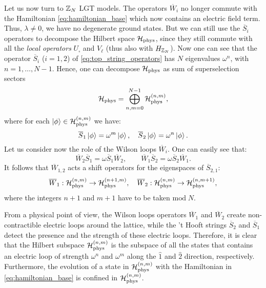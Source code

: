 Let us now turn to $\mathbb{Z}_N$ LGT models.
The operators $\overline{W}_i$ no longer commute with the Hamiltonian \eqref{eq:hamiltonian_base} which now contains an electric field term.
Thus, $\lambda \neq 0$, we have no degenerate ground states.
But we can still use the $\overline{S}_i$ operators to decompose the Hilbert space $\mathcal{H}_{\text{phys}}$, since they still commute with all the \emph{local operators} $U_{\square}$ and $V_{\ell}$ (thus also with $H_{\mathbb{Z}_N}$).
Now one can see that the operator $\overline{S}_i$ ($i=1,2$) of \eqref{eq:top_string_operators} has $N$ eigenvalues $\omega^n$, with $n=1, \dots, N-1$.
Hence, one can decompose $\mathcal{H}_{\text{phys}}$ as sum of superselection sectors
\begin{equation}
    \mathcal{H}_{\text{phys}} = \bigoplus_{n, m=0}^{N-1} \mathcal{H}_{\text{phys}}^{(n, m)},
    \label{eq:decomposizione_Hphys}
\end{equation}
where for each $\ket{\phi} \in \mathcal{H}_{\text{phys}}^{(n, m)}$ we have:
\begin{equation}
    \overline{S}_1 \ket{\phi} = \omega^{m}\ket{\phi}, \quad
    \overline{S}_2 \ket{\phi} = \omega^{n}\ket{\phi}.
\end{equation}
Let us consider now the role of the Wilson loops $\overline{W}_i$.
One can easily see that:
\begin{equation}
    \overline{W}_2 \overline{S}_1 = \omega \overline{S}_1 \overline{W}_2, \qquad
    \overline{W}_1 \overline{S}_2 = \omega \overline{S}_2 \overline{W}_1.
    \label{eq:algebra_op_nonlocali}
\end{equation}
It follows that $\overline{W}_{1,2}$ acts a shift operators for the eigenspaces of $\overline{S}_{2,1}$:
\begin{equation}
    \overline{W}_1 : \mathcal{H}_{\text{phys}}^{(n, m)} \to \mathcal{H}_{\text{phys}}^{(n + 1, m)}, \quad
    \overline{W}_2 : \mathcal{H}_{\text{phys}}^{(n, m)} \to \mathcal{H}_{\text{phys}}^{(n, m + 1)},
    \label{eq:azione_wilson_loop}
\end{equation}
where the integers $n + 1$ and $m + 1$ have to be taken $\mathrm{mod}\; N$.

From a physical point of view, the Wilson loops operators $\overline{W}_1$ and $\overline{W}_2$ create non-contractible electric loops around the lattice, while  the 't Hooft strings $\overline{S}_2$ and $\overline{S}_1$ detect the presence and the strength of these electric loops.
Therefore, it is clear that the Hilbert subspace $\mathcal{H}_{\text{phys}}^{(n, m)}$ is the subspace of all the states that contains an electric loop of strength $\omega^n$ and $\omega^{m}$ along the $\hat{1}$ and $\hat{2}$ direction, respectively.
Furthermore, the evolution of a state in $\mathcal{H}_{\text{phys}}^{(n,m)}$ with the Hamiltonian in \eqref{eq:hamiltonian_base} is confined in $\mathcal{H}_{\text{phys}}^{(n,m)}$.
